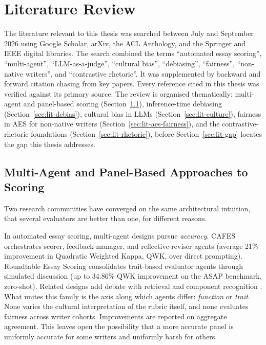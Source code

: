 \chapter{Literature Review}
\label{chap:literature}

The literature relevant to this thesis was searched between July and
September 2026 using Google Scholar, arXiv, the ACL Anthology, and the
Springer and IEEE digital libraries. The search combined the terms
``automated essay scoring'', ``multi-agent'', ``LLM-as-a-judge'',
``cultural bias'', ``debiasing'', ``fairness'', ``non-native writers'',
and ``contrastive rhetoric''. It was supplemented by backward and forward
citation chasing from key papers. Every reference cited in this thesis
was verified against its primary source. The review is organised
thematically: multi-agent and panel-based scoring
(Section~\ref{sec:lit-multiagent}), inference-time debiasing
(Section~\ref{sec:lit-debias}), cultural bias in LLMs
(Section~\ref{sec:lit-culture}), fairness in AES for non-native writers
(Section~\ref{sec:lit-aes-fairness}), and the contrastive-rhetoric
foundations (Section~\ref{sec:lit-rhetoric}), before
Section~\ref{sec:lit-gap} locates the gap this thesis addresses.

\section{Multi-Agent and Panel-Based Approaches to Scoring}
\label{sec:lit-multiagent}

Two research communities have converged on the same architectural
intuition, that several evaluators are better than one, for
different reasons.

In automated essay scoring, multi-agent designs pursue
\emph{accuracy}. CAFES \citep{su2025cafes} orchestrates scorer,
feedback-manager, and reflective-reviser agents (average 21\%
improvement in Quadratic Weighted Kappa, QWK, over direct
prompting). Roundtable Essay Scoring
\citep[RES;][]{jang2025roundtable} consolidates trait-based evaluator
agents through simulated discussion (up to 34.86\% QWK improvement
on the ASAP benchmark, zero-shot). Related designs add debate with retrieval
\citep{keramati2026madrag} and component recognition
\citep{wang2025autoscore}. What unites this family is the axis along
which agents differ: \emph{function} or \emph{trait}. None varies the
cultural interpretation of the rubric itself, and none evaluates
fairness across writer cohorts. Improvements are reported on
aggregate agreement. This leaves open the possibility that a more
accurate panel is uniformly accurate for some writers and uniformly
harsh for others.

